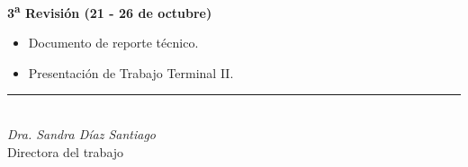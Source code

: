\documentclass[10pt, letterpaper]{article}
\begin{document}
  \noindent
  \textbf{3\textsuperscript{a} Revisión (21 - 26 de octubre)}

  \begin{itemize}

    \item Documento de reporte técnico.

    \item Presentación de Trabajo Terminal II.

  \end{itemize}

  \vspace{2.5in}
  \begin{center}
    \rule{3in}{0.4pt} \\
    \textit{Dra. Sandra Díaz Santiago} \\
    Directora del trabajo
  \end{center}
\end{document}
